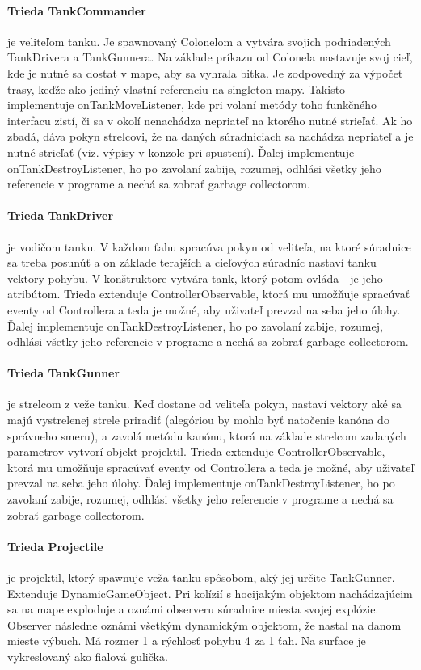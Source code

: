 \documentclass[12pt,oneside,slovak,a4paper]{article}
\begin{document}
\paragraph{Trieda TankCommander} je veliteľom tanku. Je spawnovaný Colonelom a vytvára svojich podriadených TankDrivera a TankGunnera. Na základe príkazu od Colonela nastavuje svoj cieľ, kde je nutné sa dostať v mape, aby sa vyhrala bitka. Je zodpovedný za výpočet trasy, keďže ako jediný vlastní referenciu na singleton mapy. Takisto implementuje onTankMoveListener, kde pri volaní metódy toho funkčného interfacu zistí, či sa v okolí nenachádza nepriateľ na ktorého nutné strieľať. Ak ho zbadá, dáva pokyn strelcovi, že na daných súradniciach sa nachádza nepriateľ a je nutné strieľať (viz. výpisy v konzole pri spustení). Ďalej implementuje onTankDestroyListener, ho po zavolaní zabije, rozumej, odhlási všetky jeho referencie v programe a nechá sa zobrať garbage collectorom.
\paragraph{Trieda TankDriver} je vodičom tanku. V každom ťahu spracúva pokyn od veliteľa, na ktoré súradnice sa treba posunúť a on základe terajších a cieľových súradníc nastaví tanku vektory pohybu. V konštruktore vytvára tank, ktorý potom ovláda - je jeho atribútom. Trieda extenduje ControllerObservable, ktorá mu umožňuje spracúvať eventy od Controllera a teda je možné, aby uživateľ prevzal na seba jeho úlohy. Ďalej implementuje onTankDestroyListener, ho po zavolaní zabije, rozumej, odhlási všetky jeho referencie v programe a nechá sa zobrať garbage collectorom.
\paragraph{Trieda TankGunner} je strelcom z veže tanku. Keď dostane od veliteľa pokyn, nastaví vektory aké sa majú vystrelenej strele priradiť (alegóriou by mohlo byť natočenie kanóna do správneho smeru), a zavolá metódu kanónu, ktorá na základe strelcom zadaných parametrov vytvorí objekt projektil. Trieda extenduje ControllerObservable, ktorá mu umožňuje spracúvať eventy od Controllera a teda je možné, aby uživateľ prevzal na seba jeho úlohy. Ďalej implementuje onTankDestroyListener, ho po zavolaní zabije, rozumej, odhlási všetky jeho referencie v programe a nechá sa zobrať garbage collectorom.
\paragraph{Trieda Projectile} je projektil, ktorý spawnuje veža tanku spôsobom, aký jej určite TankGunner. Extenduje DynamicGameObject. Pri kolízií s hocijakým objektom nachádzajúcim sa na mape exploduje a oznámi observeru súradnice miesta svojej explózie. Observer následne oznámi všetkým dynamickým objektom, že nastal na danom mieste výbuch. Má rozmer 1 a rýchlosť pohybu 4 za 1 ťah. Na surface je vykreslovaný ako fialová gulička. 
\end{document}
